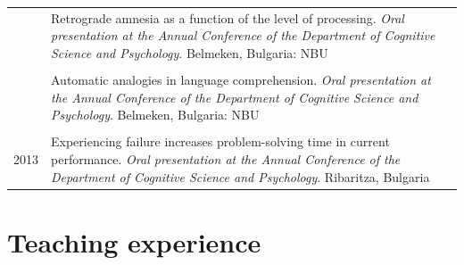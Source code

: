 \documentclass[letterpaper]{article}
\begin{document}
\begin{longtable}{p{0.7cm}p{15cm}}
  & Retrograde amnesia as a function of the level of processing. {\it  Oral presentation at the Annual Conference of the Department of Cognitive Science and Psychology}. Belmeken, Bulgaria: NBU                                                          \\[6pt]
  &                                                                                                                                                                                                                                                        \\
  & Automatic analogies in language comprehension. {\it  Oral presentation at the Annual Conference of the Department of Cognitive Science and Psychology}. Belmeken, Bulgaria: NBU                                                                        \\[6pt]
  &                                                                                                                                                                                                                                                        \\
  2013 & Experiencing failure increases problem-solving time in current performance. {\it Oral presentation at the Annual Conference of the Department of Cognitive Science and Psychology}. Ribaritza, Bulgaria                                                \\

\end{longtable}

\section*{Teaching experience}
\end{document}
